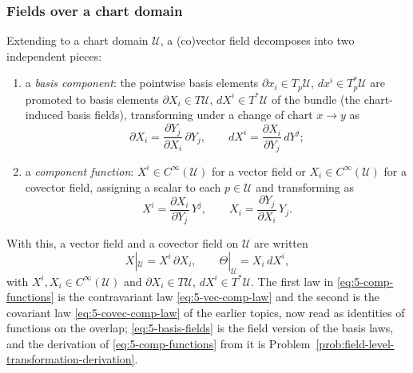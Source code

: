 \documentclass[11pt]{article}
\begin{document}
\subsubsection*{Fields over a chart domain}
Extending to a chart domain $\mathcal U$, a (co)vector field decomposes into two independent pieces:
\begin{enumerate}[label=(\arabic*)]
  \item a \emph{basis component}: the pointwise basis elements $\partial x_i\in T_p\mathcal U$, $dx^i\in T_p^*\mathcal U$ are promoted to basis elements $\partial X_i\in T\mathcal U$, $dX^i\in T^*\mathcal U$ of the bundle (the chart-induced basis fields), transforming under a change of chart $x\to y$ as
  \begin{equation}
  \partial X_i=\frac{\partial Y_j}{\partial X_i}\,\partial Y_j,\qquad dX^i=\frac{\partial X_i}{\partial Y_j}\,dY^j;
  \tag{5.8}\label{eq:5-basis-fields}
  \end{equation}
  \item a \emph{component function}: $X^i\in C^\infty(\mathcal U)$ for a vector field or $X_i\in C^\infty(\mathcal U)$ for a covector field, assigning a scalar to each $p\in\mathcal U$ and transforming as
  \begin{equation}
  X^i=\frac{\partial X_i}{\partial Y_j}\,Y^j,\qquad X_i=\frac{\partial Y_j}{\partial X_i}\,Y_j.
  \tag{5.9}\label{eq:5-comp-functions}
  \end{equation}
\end{enumerate}
With this, a vector field and a covector field on $\mathcal U$ are written
\[
X|_{\mathcal U}=X^i\,\partial X_i,\qquad\Theta|_{\mathcal U}=X_i\,dX^i,
\]
with $X^i,X_i\in C^\infty(\mathcal U)$ and $\partial X_i\in T\mathcal U$, $dX^i\in T^*\mathcal U$. The first law in \eqref{eq:5-comp-functions} is the contravariant law \eqref{eq:5-vec-comp-law} and the second is the covariant law \eqref{eq:5-covec-comp-law} of the earlier topics, now read as identities of functions on the overlap; \eqref{eq:5-basis-fields} is the field version of the basis laws, and the derivation of \eqref{eq:5-comp-functions} from it is Problem~\ref{prob:field-level-transformation-derivation}.
\end{document}
